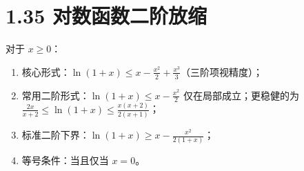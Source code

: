 \documentclass{article}
\begin{document}
\section*{1.35 对数函数二阶放缩}
对于 \( x \geq 0 \)：
\begin{enumerate}
    \item 核心形式：\( \ln(1+x) \leq x - \frac{x^2}{2} + \frac{x^3}{3} \)（三阶项视精度）；
    \item 常用二阶形式：\( \ln(1+x) \leq x - \frac{x^2}{2} \) 仅在局部成立；更稳健的为 \( \frac{2x}{x+2} \leq \ln(1+x) \leq \frac{x(x+2)}{2(x+1)} \)；
    \item 标准二阶下界：\( \ln(1+x) \geq x - \frac{x^2}{2(1+x)} \)；
    \item 等号条件：当且仅当 \( x=0 \)。
\end{enumerate}
\end{document}
